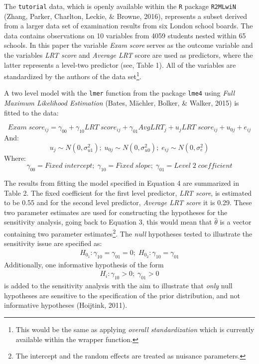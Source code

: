\documentclass[
  english,
  man]{apa6}
\begin{document}
The \texttt{tutorial} data, which is openly available within the \texttt{R} package \texttt{R2MLwiN} (Zhang, Parker, Charlton, Leckie, \& Browne, 2016), represents a subset derived from a larger data set of examination results from six London school boards. The data contains observations on 10 variables from 4059 students nested within 65 schools. In this paper the variable \emph{Exam score} serves as the outcome variable and the variables \emph{LRT score} and \emph{Average LRT} score are used as predictors, where the latter represents a level-two predictor (see, Table 1). All of the variables are standardized by the authors of the data set\footnote{This would be the same as applying \emph{overall standardization} which is currently available within the wrapper function.}.

A two level model with the \texttt{lmer} function from the package \texttt{lme4} using \emph{Full Maximum Likelihood Estimation}
(Bates, Mächler, Bolker, \& Walker, 2015) is fitted to the data:

\begin{equation}
Exam\;score_{ij} = \gamma_{00} + \gamma_{10}LRT\;score_{ij} + \gamma_{01}AvgLRT_{j} + u_{j}LRT\;score_{ij} + u_{0j} + e_{ij}
\end{equation}
And:
\begin{equation*}
u_{j}\sim N(0, \sigma_{u1}^2);\;
u_{0j}\sim N(0, \sigma_{u0}^2);\;
e_{ij} \sim N(0, \sigma^2_e)
\end{equation*}
Where:
\begin{equation*}
\gamma_{00}=Fixed\; intercept;\; 
\gamma_{10}=Fixed\; slope;\;
\gamma_{01}=Level \;2\;coefficient
\end{equation*}

The results from fitting the model specified in Equation 4 are summarized in Table 2. The fixed coefficient for the first level predictor, \emph{LRT score}, is estimated to be 0.55 and for the second level predictor, \emph{Average LRT score} it is 0.29. These two parameter estimates are used for constructing the hypotheses for the sensitivity analysis, going back to Equation 3, this would mean that \(\hat{\theta}\) is a vector containing two parameter estimates\footnote{The intercept and the random effects are treated as nuisance parameters.}.
The \emph{null} hypotheses tested to illustrate the sensitivity issue are specified as:
\begin{align*}
  H_{0_1}: \gamma_{10} = \gamma_{01} = 0;\; 
  H_{0_2}: \gamma_{10} = \gamma_{01}
  \end{align*}
Additionally, one informative hypothesis of the form
\begin{align*}
H_{i}: \gamma_{10} >0;\; 
\gamma_{01} > 0
\end{align*}
is added to the sensitivity analysis with the aim to illustrate that \emph{only} null hypotheses are sensitive to the specification of the prior distribution, and not informative hypotheses (Hoijtink, 2011).
\end{document}
